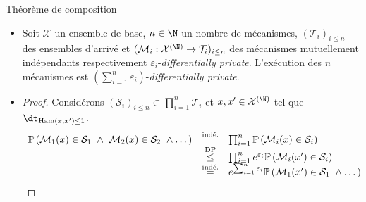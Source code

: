 \documentclass[10pt,serif]{beamer}
\begin{document}
  \begin{frame}{Théorème de composition}
    \begin{itemize}
      \item<1-> \begin{theorem}
          \label{compo}
          Soit \(\mathcal X\) un ensemble de base, \(n \in \N\) un nombre de mécanismes, \((\mathcal T_i)_{i \leq n}\) des ensembles d'arrivé et \((\mathcal M_i : \mathcal X^{(\N)} \to \mathcal T_i)_{i \leq n}\) des mécanismes mutuellement indépendants respectivement \(\varepsilon_i\)-\textit{differentially private}. L’exécution des \(n\) mécanismes est \(\left(\sum\limits_{i = 1}^n \varepsilon_i\right)\)-\textit{differentially private}.
        \end{theorem} 
        \vspace{-0.3cm}
      \item<2> \begin{proof}
          Considérons \((\mathcal S_i)_{i \leq n} \subset \prod_{i = 1}^n \mathcal T_i\) et \(x, x' \in \mathcal X^{(\N)}\) tel que \(\dt_{\text{Ham}(x,x') \leq 1}\).
          \[
              \begin{array}[]{rcl}
                  \mathbb P\left(\mathcal M_1(x) \in \mathcal S_1 \ \wedge \ \mathcal M_2(x) \in \mathcal S_2 \ \wedge \dots \right) & \overset{\text{indé.}}{=} & \prod_{i = 1}^n \mathbb P\left(\mathcal M_i(x) \in \mathcal S_i \right)\\
                  & \overset{\text{DP}}{\leq} & \prod_{i = 1}^n e^{\varepsilon_i}\mathbb P\left(\mathcal M_i(x') \in \mathcal S_i \right)\\
                  & \overset{\text{indé.}}{=} & e^{\sum_{i = 1}^n \varepsilon_i}\mathbb P\left(\mathcal M_1(x') \in \mathcal S_1 \ \wedge \dots \right)
              \end{array}
          \]
        \end{proof}
    \end{itemize}
  \end{frame}
\end{document}

